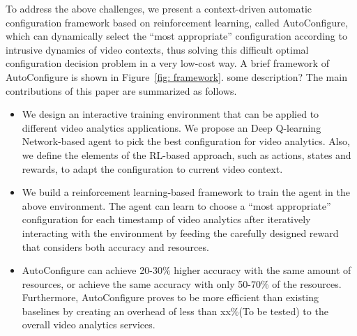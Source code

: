 To address the above challenges, we present a context-driven automatic configuration framework based on reinforcement learning, called AutoConfigure, which can dynamically select the ``most appropriate'' configuration according to intrusive dynamics of video contexts, thus solving this difficult optimal configuration decision problem in a very low-cost way. A brief framework of AutoConfigure is shown in Figure~\ref{fig: framework}. \textcolor{note}{some description?} The main contributions of this paper are summarized as follows.

\begin{itemize}	
\item We design an interactive training environment that can be applied to different video analytics applications. We propose an Deep Q-learning Network-based \cite{DQN} agent to pick the best configuration for video analytics. Also, we define the elements of the RL-based approach, such as actions, states and rewards, to adapt the configuration to current video context.

\item We build a reinforcement learning-based framework to train the agent in the above environment. The agent can learn to choose a ``most appropriate'' configuration for each timestamp of video analytics after iteratively interacting with the environment by feeding the carefully designed reward that considers both accuracy and resources.
 
\item AutoConfigure can achieve 20-30\% higher accuracy with the
same amount of resources, or achieve the same accuracy
with only 50-70\% of the resources. Furthermore, AutoConfigure proves to be more efficient than existing baselines by creating an overhead of less than xx\%\textcolor{note}{(To be tested)} to the overall video analytics services.
\end{itemize}

